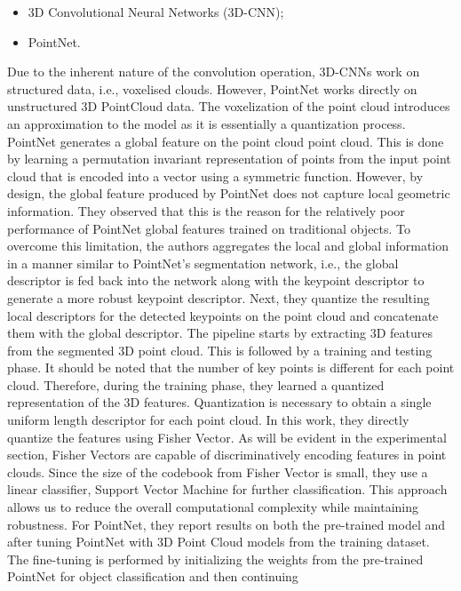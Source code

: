 \begin{itemize}
\item 3D Convolutional Neural Networks (3D-CNN);
\item PointNet.
\end{itemize}

Due to the inherent nature of the convolution operation, 3D-CNNs work on structured data, i.e., voxelised clouds. However, PointNet\cite{garcia2016pointnet} works
directly on unstructured 3D PointCloud data. The voxelization of the point cloud introduces an approximation to the model as it is essentially a quantization process. PointNet
generates a global feature on the point cloud point cloud. This is done by learning a permutation invariant representation of points from the input point cloud that is
encoded into a vector using a symmetric function.  However, by design, the global feature produced by PointNet does not capture local geometric information. They observed
that this is the reason for the relatively poor performance of PointNet global features trained on traditional objects. To overcome this limitation, the authors aggregates the
local and global information in a manner similar to PointNet's segmentation network, i.e., the global descriptor is fed back into the network along with the keypoint
descriptor to generate a more robust keypoint descriptor. Next, they quantize the resulting local descriptors for the detected keypoints on the point cloud and concatenate
them with the global descriptor. The pipeline starts by extracting 3D features from the segmented 3D point cloud. This is followed by a training and testing phase.
It should be noted that the number of key points is different for each point cloud. Therefore, during the training phase, they learned a quantized representation of
the 3D features. Quantization is necessary to obtain a single uniform length descriptor for each point cloud.  In this work, they directly quantize the features using
Fisher Vector. As will be evident in the experimental section, Fisher Vectors are capable of discriminatively encoding features in point clouds. Since the size of the
codebook from Fisher Vector is small, they use a linear classifier, Support Vector Machine for further classification. This approach allows us to reduce the overall
computational complexity while maintaining robustness. For PointNet, they report results on both the pre-trained model and after tuning PointNet with 3D Point Cloud
models from the training dataset. The fine-tuning is performed by initializing the weights from the pre-trained PointNet for object classification and then continuing
